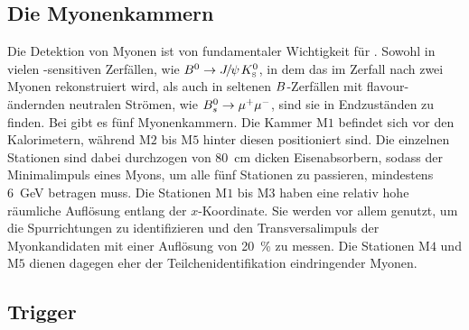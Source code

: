 \subsection{Die Myonenkammern}

Die Detektion von Myonen ist von fundamentaler Wichtigkeit für \lhcb. Sowohl in vielen \CP-sensitiven Zerfällen, wie ${{B}^0}\rightarrow{\ensuremath{{J\mskip -3mu/\mskip -2mu\psi\mskip 2mu}}}{\ensuremath{{K}^0_{\rm\scriptscriptstyle S}}}$, in dem das \jpsi im Zerfall nach zwei Myonen rekonstruiert wird, als auch in seltenen ${B}$-Zerfällen mit flavour-ändernden neutralen Strömen, wie ${{B}^0_{s}}\rightarrow{\ensuremath{\mu^+}}{\ensuremath{\mu^-}}$, sind sie in Endzuständen zu finden. Bei \lhcb gibt es fünf Myonenkammern. Die Kammer M$1$ befindet sich vor den Kalorimetern, während M$2$ bis M$5$ hinter diesen positioniert sind. Die einzelnen Stationen sind dabei durchzogen von \SI{80}{cm} dicken Eisenabsorbern, sodass der Minimalimpuls eines Myons, um alle fünf Stationen zu passieren, mindestens \SI{6}{GeV} betragen muss. Die Stationen M$1$ bis M$3$ haben eine relativ hohe räumliche Auflösung entlang der $x$-Koordinate. Sie werden vor allem genutzt, um die Spurrichtungen zu identifizieren und den Transversalimpuls \pt der Myonkandidaten mit einer Auflösung von \SI{20}{\%} zu messen. Die Stationen M$4$ und M$5$ dienen dagegen eher der Teilchenidentifikation eindringender Myonen.  

\subsection{Trigger}\label{sec:trigger}

